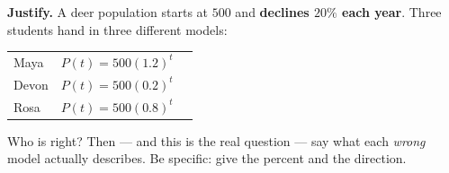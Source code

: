 \documentclass[10pt]{article}
\begin{document}
\begin{tcolorbox}[colback=white, colframe=black!40, title=\textbf{Tier A --- Approaching Proficiency},
    fonttitle=\bfseries, arc=1.5mm, left=3mm, right=3mm, top=2mm, bottom=2mm, breakable]
\vspace{6pt}
\textbf{Justify.} A deer population starts at $500$ and \textbf{declines $20\%$ each year}. Three
students hand in three different models:
\begin{center}
\small
\renewcommand{\arraystretch}{1.3}
\begin{tabularx}{0.94\linewidth}{@{}l l X@{}}
\hline
Maya & $P(t)=500(1.2)^{t}$ & \\
Devon & $P(t)=500(0.2)^{t}$ & \\
Rosa & $P(t)=500(0.8)^{t}$ & \\
\hline
\end{tabularx}
\end{center}
Who is right? Then --- and this is the real question --- say what each \emph{wrong} model actually
describes. Be specific: give the percent and the direction. 
\end{tcolorbox}
\end{document}
